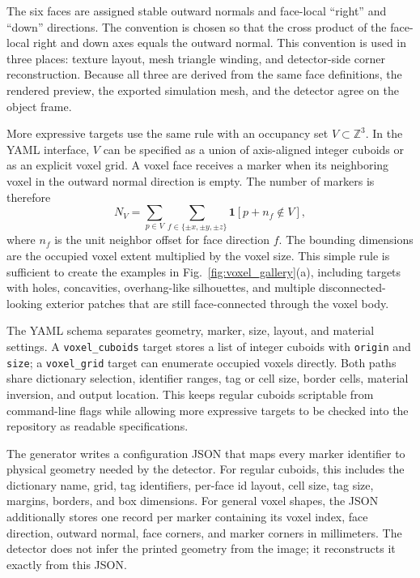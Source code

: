 \documentclass[conference]{IEEEtran}
\begin{document}
The six faces are assigned stable outward normals and face-local ``right'' and ``down'' directions. The convention is chosen so that the cross product of the face-local right and down axes equals the outward normal. This convention is used in three places: texture layout, mesh triangle winding, and detector-side corner reconstruction. Because all three are derived from the same face definitions, the rendered preview, the exported simulation mesh, and the detector agree on the object frame.

More expressive targets use the same rule with an occupancy set \(V \subset \mathbb{Z}^3\). In the YAML interface, \(V\) can be specified as a union of axis-aligned integer cuboids or as an explicit voxel grid. A voxel face receives a marker when its neighboring voxel in the outward normal direction is empty. The number of markers is therefore
\begin{equation}
N_V=\sum_{p\in V}\sum_{f\in \{\pm x,\pm y,\pm z\}}\mathbf{1}[p+n_f \notin V],
\end{equation}
where \(n_f\) is the unit neighbor offset for face direction \(f\). The bounding dimensions are the occupied voxel extent multiplied by the voxel size. This simple rule is sufficient to create the examples in Fig.~\ref{fig:voxel_gallery}(a), including targets with holes, concavities, overhang-like silhouettes, and multiple disconnected-looking exterior patches that are still face-connected through the voxel body.

The YAML schema separates geometry, marker, size, layout, and material settings. A \texttt{voxel\_cuboids} target stores a list of integer cuboids with \texttt{origin} and \texttt{size}; a \texttt{voxel\_grid} target can enumerate occupied voxels directly. Both paths share dictionary selection, identifier ranges, tag or cell size, border cells, material inversion, and output location. This keeps regular cuboids scriptable from command-line flags while allowing more expressive targets to be checked into the repository as readable specifications.

The generator writes a configuration JSON that maps every marker identifier to physical geometry needed by the detector. For regular cuboids, this includes the dictionary name, grid, tag identifiers, per-face id layout, cell size, tag size, margins, borders, and box dimensions. For general voxel shapes, the JSON additionally stores one record per marker containing its voxel index, face direction, outward normal, face corners, and marker corners in millimeters. The detector does not infer the printed geometry from the image; it reconstructs it exactly from this JSON.
\end{document}
